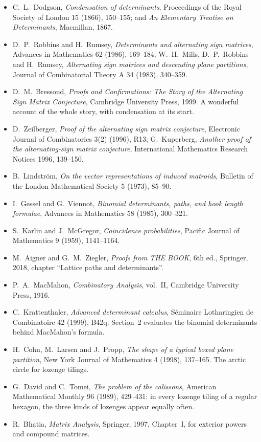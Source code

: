 \begin{itemize}
\item C.~L.~Dodgson, \emph{Condensation of determinants}, Proceedings of the Royal Society of London 15 (1866), 150--155;
and \emph{An Elementary Treatise on Determinants}, Macmillan, 1867.
\item D.~P.~Robbins and H.~Rumsey, \emph{Determinants and alternating sign matrices}, Advances in Mathematics 62 (1986),
169--184; W.~H.~Mills, D.~P.~Robbins and H.~Rumsey, \emph{Alternating sign matrices and descending plane partitions},
Journal of Combinatorial Theory A 34 (1983), 340--359.
\item D.~M.~Bressoud, \emph{Proofs and Confirmations: The Story of the Alternating Sign Matrix Conjecture}, Cambridge
University Press, 1999. A wonderful account of the whole story, with condensation at its start.
\item D.~Zeilberger, \emph{Proof of the alternating sign matrix conjecture}, Electronic Journal of Combinatorics 3(2)
(1996), R13; G.~Kuperberg, \emph{Another proof of the alternating-sign matrix conjecture}, International Mathematics
Research Notices 1996, 139--150.
\item B.~Lindstr\"om, \emph{On the vector representations of induced matroids}, Bulletin of the London Mathematical
Society 5 (1973), 85--90.
\item I.~Gessel and G.~Viennot, \emph{Binomial determinants, paths, and hook length formulae}, Advances in Mathematics 58
(1985), 300--321.
\item S.~Karlin and J.~McGregor, \emph{Coincidence probabilities}, Pacific Journal of Mathematics 9 (1959), 1141--1164.
\item M.~Aigner and G.~M.~Ziegler, \emph{Proofs from THE BOOK}, 6th ed., Springer, 2018, chapter ``Lattice paths and
determinants''.
\item P.~A.~MacMahon, \emph{Combinatory Analysis}, vol.~II, Cambridge University Press, 1916.
\item C.~Krattenthaler, \emph{Advanced determinant calculus}, S\'eminaire Lotharingien de Combinatoire 42 (1999), B42q.
Section~2 evaluates the binomial determinants behind MacMahon's formula.
\item H.~Cohn, M.~Larsen and J.~Propp, \emph{The shape of a typical boxed plane partition}, New York Journal of Mathematics
4 (1998), 137--165. The arctic circle for lozenge tilings.
\item G.~David and C.~Tomei, \emph{The problem of the calissons}, American Mathematical Monthly 96 (1989), 429--431: in
every lozenge tiling of a regular hexagon, the three kinds of lozenges appear equally often.
\item R.~Bhatia, \emph{Matrix Analysis}, Springer, 1997, Chapter~I, for exterior powers and compound matrices.
\end{itemize}
